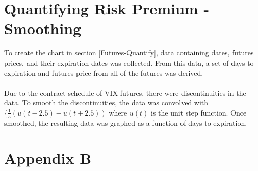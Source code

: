 \documentclass[11pt, oneside]{book}
\begin{document}
\chapter{Quantifying Risk Premium - Smoothing} \label{AppendixA}
To create the chart in section \ref{Futures-Quantify}, data containing dates, futures prices, and their expiration dates was collected. From this data, a set of days to expiration and futures price from all of the futures was derived. \\
\\
Due to the contract schedule of VIX futures, there were discontinuities in the data. To smooth the discontinuities, the data was convolved with $\{\frac{1}{5}(u(t-2.5)-u(t+2.5))$ where $u(t)$ is the unit step function. Once smoothed, the resulting data was graphed as a function of days to expiration.

\chapter{Appendix B} \label{AppendixB}
\end{document}
